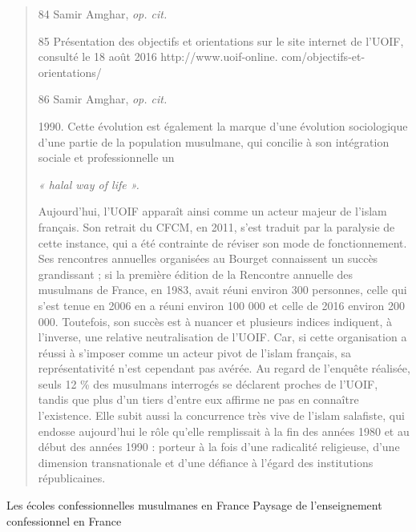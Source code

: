 \begin{quote}
84 Samir Amghar, \emph{op. cit.}

85 Présentation des objectifs et orientations sur le site internet de
l'UOIF, consulté le 18 août 2016 http://www.uoif-online.
com/objectifs-et-orientations/

86 Samir Amghar, \emph{op. cit.}



1990. Cette évolution est également la marque d'une évolution
sociologique d'une partie de la population musulmane, qui concilie à son
intégration sociale et professionnelle un

\emph{« halal way of life ».}

Aujourd'hui, l'UOIF apparaît ainsi comme un acteur majeur de l'islam
français. Son retrait du CFCM, en 2011, s'est traduit par la paralysie
de cette instance, qui a été contrainte de réviser son mode de
fonctionnement. Ses rencontres annuelles organisées au Bourget
connaissent un succès grandissant ; si la première édition de la
Rencontre annuelle des musulmans de France, en 1983, avait réuni environ
300 personnes, celle qui s'est tenue en 2006 en a réuni environ 100 000
et celle de 2016 environ 200 000. Toutefois, son succès est à nuancer et
plusieurs indices indiquent, à l'inverse, une relative neutralisation de
l'UOIF. Car, si cette organisation a réussi à s'imposer comme un acteur
pivot de l'islam français, sa représentativité n'est cependant pas
avérée. Au regard de l'enquête réalisée, seuls 12 \% des musulmans
interrogés se déclarent proches de l'UOIF, tandis que plus d'un tiers
d'entre eux affirme ne pas en connaître l'existence. Elle subit aussi la
concurrence très vive de l'islam salafiste, qui endosse aujourd'hui le
rôle qu'elle remplissait à la fin des années 1980 et au début des années
1990 : porteur à la fois d'une radicalité religieuse, d'une dimension
transnationale et d'une défiance à l'égard des institutions
républicaines.
\end{quote}

Les écoles confessionnelles musulmanes en France Paysage de
l'enseignement confessionnel en France

